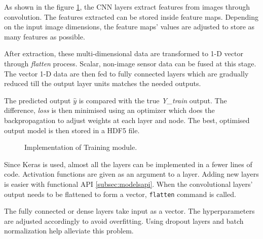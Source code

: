 As shown in the figure \ref{fig:trainingmodule}, the CNN layers extract features from
images through convolution. The features extracted can be stored inside feature maps. Depending on the input image dimensions, the
feature maps' values are adjusted to store as many features as possible.

After extraction, these multi-dimensional data are transformed to 1-D vector through
\textit{flatten} process. Scalar, non-image sensor data can be fused at this stage. The
vector 1-D data are then fed to fully connected layers which are gradually reduced till
the output layer units matches the needed outputs.

The predicted output $\hat{y}$ is compared with the true \textit{Y\_train} output. The
difference, \textit{loss} is then minimised using an optimizer which does the
backpropagation to adjust weights at each layer and node. The best, optimised output model
is then stored in a HDF5 file.
\iffalse
For CNN layers, feature maps starting from 24 channels is chosen and gradually increased till 64.
The stride is always kept at 2 whereas the kernel size is (5,5) for the early and
(3,3) for the later stages. For early data fusion, the input is already fused and directly
fed to the neural network. However, for late fusion, concatenation is done at appropriate
stages. If necessary, max pooling and batch normalization layers are added to the neural
network. Most often to distribute the features uniformly and to make the cost function
distribute symmetrically, the inputs are normalized. In this case, since images are pixel
values between 0-255, each pixel is divided by 255 to bring it in the range between 0 and
1.
\fi
\begin{figure}
    \centering
        \def\svgwidth{\textwidth}
    \caption{Implementation of Training module.}
    \label{fig:trainingmodule}
\end{figure}
\iffalse
Since Keras is used, almost all the layers can be implemented in a fewer lines of code.
Activation functions are given as an argument to a layer. Adding new layers is easier with
functional API \ref{subsec:modelsapi}. When the convolutional layers' output needs to be
flattened to form a vector, \texttt{flatten} command is called.

The fully connected or dense layers take input as a vector. The hyperparameters are
adjusted accordingly to avoid overfitting. Using dropout layers and batch normalization
help alleviate this problem.

